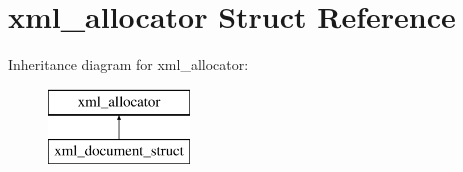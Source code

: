 \hypertarget{structxml__allocator}{\section{xml\-\_\-allocator Struct Reference}
\label{structxml__allocator}
}
Inheritance diagram for xml\-\_\-allocator\-:\begin{figure}[H]
\begin{center}
\leavevmode
\includegraphics[height=2.000000cm]{structxml__allocator}
\end{center}
\end{figure}
